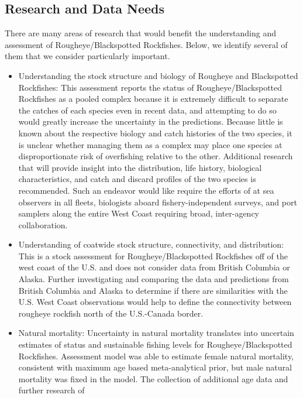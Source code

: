 \documentclass[
]{scrartcl}
\begin{document}
\subsection{Research and Data Needs}\label{research-and-data-needs}

There are many areas of research that would benefit the understanding
and assessment of Rougheye/Blackspotted Rockfishes. Below, we identify
several of them that we consider particularly important.

\begin{itemize}
\item
  Understanding the stock structure and biology of Rougheye and
  Blackspotted Rockfishes: This assessment reports the status of
  Rougheye/Blackspotted Rockfishes as a pooled complex because it is
  extremely difficult to separate the catches of each species even in
  recent data, and attempting to do so would greatly increase the
  uncertainty in the predictions. Because little is known about the
  respective biology and catch histories of the two species, it is
  unclear whether managing them as a complex may place one species at
  disproportionate risk of overfishing relative to the other. Additional
  research that will provide insight into the distribution, life
  history, biological characteristics, and catch and discard profiles of
  the two species is recommended. Such an endeavor would like require
  the efforts of at sea observers in all fleets, biologists aboard
  fishery-independent surveys, and port samplers along the entire West
  Coast requiring broad, inter-agency collaboration.
\item
  Understanding of coatwide stock structure, connectivity, and
  distribution: This is a stock assessment for Rougheye/Blackspotted
  Rockfishes off of the west coast of the U.S. and does not consider
  data from British Columbia or Alaska. Further investigating and
  comparing the data and predictions from British Columbia and Alaska to
  determine if there are similarities with the U.S. West Coast
  observations would help to define the connectivity between rougheye
  rockfish north of the U.S.-Canada border.
\item
  Natural mortality: Uncertainty in natural mortality translates into
  uncertain estimates of status and sustainable fishing levels for
  Rougheye/Blackspotted Rockfishes. Assessment model was able to
  estimate female natural mortality, consistent with maximum age based
  meta-analytical prior, but male natural mortality was fixed in the
  model. The collection of additional age data and further research of

\end{itemize}
\end{document}
